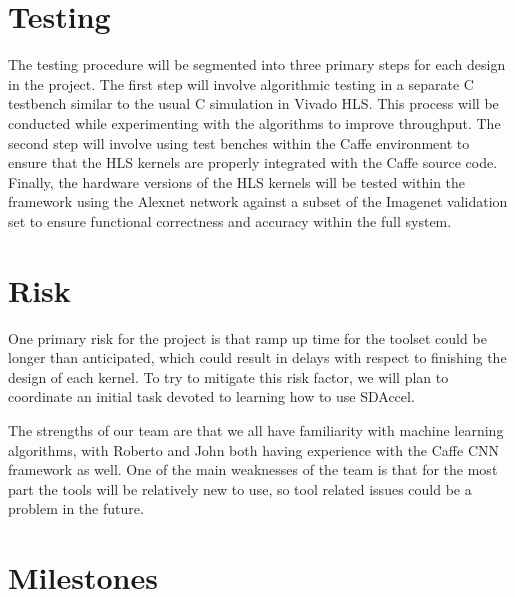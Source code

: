 \documentclass[conference,compsoc]{IEEEtran/IEEEtran}
\begin{document}
\section{Testing}\label{section:testing}

The testing procedure will be segmented into three primary steps for each design in the project.
The first step will involve algorithmic testing in a separate C testbench similar to the usual C
simulation in Vivado HLS. This process will be conducted while experimenting with the algorithms
to improve throughput. The second step will involve using test benches within the Caffe environment
to ensure that the HLS kernels are properly integrated with the Caffe source code. Finally, the
hardware versions of the HLS kernels will be tested within the framework using the Alexnet network
against a subset of the Imagenet validation set to ensure functional correctness and accuracy
within the full system.

\section{Risk}\label{section:risk}

One primary risk for the project is that ramp up time for the toolset could be longer than
anticipated, which could result in delays with respect to finishing the design of each kernel.
To try to mitigate this risk factor, we will plan to coordinate an initial task devoted to
learning how to use SDAccel.

The strengths of our team are that we all have familiarity with machine learning algorithms,
with Roberto and John both having experience with the Caffe CNN framework as well. One of the
main weaknesses of the team is that for the most part the tools will be relatively new to use,
so tool related issues could be a problem in the future.

\section{Milestones}\label{section:milestones}
\end{document}
